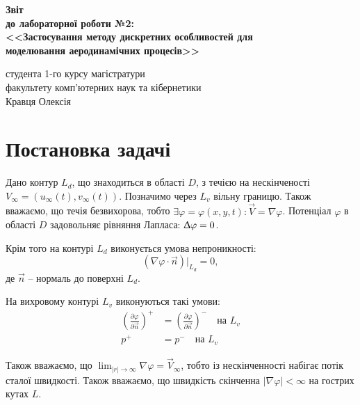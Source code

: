 \documentclass[a4paper,12pt]{article}
\begin{document}
	
\begin{titlepage}
	\vspace*{6cm}
	\begin{center}
		
		\large
		\textbf{Звіт}\\
		\textbf{до лабораторної роботи №2:}\\
		\textbf{<<Застосування
			методу дискретних особливостей для\\
			моделювання аеродинамічних процесів>>}
		
	\end{center}
	
	\vspace{8cm}
	\begin{flushright}
		студента 1-го курсу магістратури\\
		факультету комп'ютерних наук та кібернетики\\
		Кравця Олексія
	\end{flushright}
	
\end{titlepage}

\newpage
	
\section{Постановка задачі}
	
	
	Дано контур $L_d$, що знаходиться в області $D$, з течією на нескінченості $V_{\infty} = (u_{\infty}(t), v_{\infty}(t))$. Позначимо через $L_v$ вільну границю. Також вважаємо, що течія безвихорова, тобто $\exists \varphi = \varphi(x,y,t) : \vec{V} = \nabla \varphi$. Потенціал $\varphi$ в області $D$ задовольняє рівняння Лапласа: $\Updelta \varphi =0$.
	
	Крім того на контурі $L_d$ виконується умова непроникності:
	\[
		\left( \nabla \varphi \cdot \vec{n} \right)|_{L_d} = 0,
	\]
	де $\vec{n}$ -- нормаль до поверхні $L_d$.
	
	На вихровому контурі $L_v$ виконуються такі умови:
	\begin{align}
		\left( \frac{\partial \varphi}{\partial \vec{n}} \right)^+ &= \left( \frac{\partial \varphi}{\partial \vec{n}} \right)^- \quad \text{на } L_v \nonumber \\
		p^+ &= p^- \quad \text{на } L_v \nonumber
	\end{align}
	
	Також вважаємо, що $\lim_{|r| \rightarrow \infty} \nabla \varphi = \vec{V}_{\infty}$, тобто із нескінченності набігає потік сталої швидкості. Також вважаємо, що швидкість скінченна $|\nabla \varphi| < \infty$ на гострих кутах $L$.
	
\end{document}
